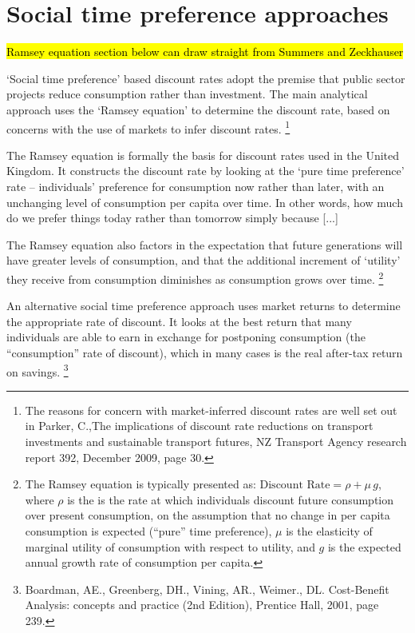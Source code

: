 \section{Social time preference approaches}

\hl{Ramsey equation section below can draw straight from Summers and Zeckhauser}

‘Social time preference’ based discount rates adopt the premise that public sector projects reduce consumption rather than investment. The main analytical approach uses the ‘Ramsey equation’ to determine the discount rate, based on concerns with the use of markets to infer discount rates.%
    \footnote{The reasons for concern with market-inferred discount rates are well set out in Parker, C.,The implications of discount rate reductions on transport investments and sustainable transport futures, NZ Transport Agency research report 392, December 2009, page 30.}

The Ramsey equation is formally the basis for discount rates used in the United Kingdom. It constructs the discount rate by looking at the ‘pure time preference’ rate – individuals’ preference for consumption now rather than later, with an unchanging level of consumption per capita over time. In other words, how much do we prefer things today rather than tomorrow simply because [...]

The Ramsey equation also factors in the expectation that future generations will have greater levels of consumption, and that the additional increment of ‘utility’ they receive from consumption diminishes as consumption grows over time.%
    \footnote{The Ramsey equation is typically presented as: \(\text{Discount Rate} = \rho + \mu\,g\), where \(\rho\) is the is the rate at which individuals discount future consumption over present consumption, on the assumption that no change in per capita consumption is expected (``pure'' time preference), \(\mu\) is the elasticity of marginal utility of consumption with respect to utility, and \(g\) is the expected annual growth rate of consumption per capita.}

An alternative social time preference approach uses market returns to determine the appropriate rate of discount. It looks at the best return that many individuals are able to earn in exchange for postponing consumption (the “consumption” rate of discount), which in many cases is the real after-tax return on savings.%
    \footnote{Boardman, AE., Greenberg, DH., Vining, AR., Weimer., DL. Cost-Benefit Analysis: concepts and practice (2nd Edition), Prentice Hall, 2001, page 239.}

